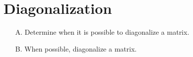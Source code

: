 \section{Diagonalization}

\begin{outcome}
\begin{enumerate}
\item[A.] Determine when it is possible to diagonalize a matrix.

\item[B.] When possible, diagonalize a matrix. 
\end{enumerate}
\end{outcome}